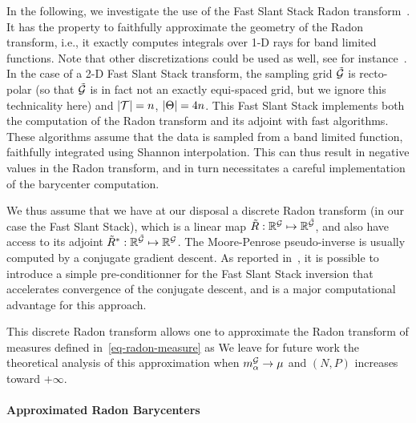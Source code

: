 In the following, we investigate the use of the Fast Slant Stack Radon transform~\cite{Averbuch-slantstack}. It has the property to faithfully approximate the geometry of the Radon transform, i.e., it exactly computes integrals over 1-D rays for band limited functions. Note that other discretizations could be used as well, see for instance~\cite{Brady-Radon}. In the case of a 2-D Fast Slant Stack transform, the sampling grid ${\tilde {\mathcal{G}}}$ is recto-polar (so that $\tilde{\mathcal{G}}$ is in fact not an exactly equi-spaced grid, but we ignore this technicality here) and $|\mathcal{T}| = n$, $|\Theta|=4n$. This Fast Slant Stack implements both the computation of the Radon transform and its adjoint with fast algorithms. These algorithms assume that the data is sampled from a band limited function, faithfully integrated using Shannon interpolation. This can thus result in negative values in the Radon transform, and in turn necessitates a careful implementation of the barycenter computation. 

We thus assume that we have at our disposal a discrete Radon transform (in our case the Fast Slant Stack), which is a linear map $\tilde R : \mathbb{R}^{\mathcal{G}} \mapsto \mathbb{R}^{{\tilde {\mathcal{G}}}}$, and also have access to its adjoint $\tilde R^* : \mathbb{R}^{{\tilde {\mathcal{G}}}} \mapsto \mathbb{R}^{\mathcal{G}}$. The Moore-Penrose pseudo-inverse 
is usually computed by a conjugate gradient descent. As reported in~\cite{Averbuch-slantstack}, it is possible to introduce a simple pre-con\-di\-tion\-ner for the Fast Slant Stack inversion that accelerates convergence of the conjugate descent, and is a major computational advantage for this approach.

This discrete Radon transform allows one to approximate the Radon transform of measures defined in~\eqref{eq-radon-measure} as
We leave for future work the theoretical analysis of this approximation when ${m_{ \alpha }^{\mathcal{G}}} \rightarrow \mu$ and $(N,P)$ increases toward $+\infty$. 


\paragraph{Approximated Radon Barycenters}

